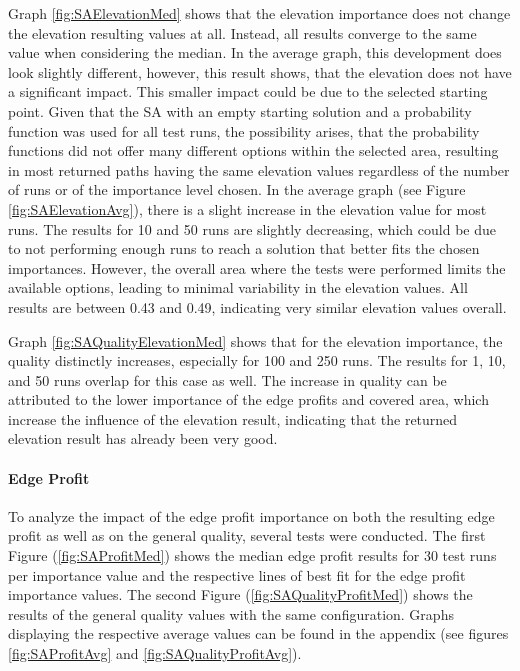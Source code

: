 Graph \ref{fig:SAElevationMed} shows that the elevation importance does not change the elevation resulting values at all.
Instead, all results converge to the same value when considering the median. 
In the average graph, this development does look slightly different, however, this result shows, that the elevation does not have a significant impact.
This smaller impact could be due to the selected starting point.
Given that the SA with an empty starting solution and a probability function was used for all test runs, the possibility arises, that the probability functions did not offer many different options within the selected area, resulting in most returned paths having the same elevation values regardless of the number of runs or of the importance level chosen.
In the average graph (see Figure \ref{fig:SAElevationAvg}), there is a slight increase in the elevation value for most runs.
The results for 10 and 50 runs are slightly decreasing, which could be due to not performing enough runs to reach a solution that better fits the chosen importances.
However, the overall area where the tests were performed limits the available options, leading to minimal variability in the elevation values.
All results are between 0.43 and 0.49, indicating very similar elevation values overall.


Graph \ref{fig:SAQualityElevationMed} shows that for the elevation importance, the quality distinctly increases, especially for 100 and 250 runs. 
The results for 1, 10, and 50 runs overlap for this case as well.
The increase in quality can be attributed to the lower importance of the edge profits and covered area, which increase the influence of the elevation result, indicating that the returned elevation result has already been very good.



\paragraph{Edge Profit}


To analyze the impact of the edge profit importance on both the resulting edge profit as well as on the general quality, several tests were conducted.
The first Figure (\ref{fig:SAProfitMed}) shows the median edge profit results for 30 test runs per importance value and the respective lines of best fit for the edge profit importance values.
The second Figure (\ref{fig:SAQualityProfitMed}) shows the results of the general quality values with the same configuration.
Graphs displaying the respective average values can be found in the appendix (see figures \ref{fig:SAProfitAvg} and \ref{fig:SAQualityProfitAvg}).


